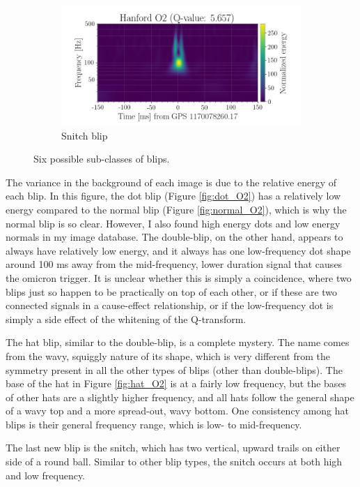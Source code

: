 \documentclass[a4paper]{article}
\begin{document}
\begin{figure}[h!]
\begin{subfigure}{.49\textwidth}
		\centering
		\includegraphics[width=1\linewidth]{snitch_O2}
		\caption{Snitch blip}
		\label{fig:snitch_O2}
	\end{subfigure}
	\caption{Six possible sub-classes of blips.}
	\label{fig:six}
\end{figure}

The variance in the background of each image is due to the relative energy of each blip. In this figure, the dot blip (Figure \ref{fig:dot_O2}) has a relatively low energy compared to the normal blip (Figure \ref{fig:normal_O2}), which is why the normal blip is so clear. However, I also found high energy dots and low energy normals in my image database. The double-blip, on the other hand, appears to always have relatively low energy, and it always has one low-frequency dot shape around 100 ms away from the mid-frequency, lower duration signal that causes the omicron trigger. It is unclear whether this is simply a coincidence, where two blips just so happen to be practically on top of each other, or if these are two connected signals in a cause-effect relationship, or if the low-frequency dot is simply a side effect of the whitening of the Q-transform.

The hat blip, similar to the double-blip, is a complete mystery. The name comes from the wavy, squiggly nature of its shape, which is very different from the symmetry present in all the other types of blips (other than double-blips). The base of the hat in Figure \ref{fig:hat_O2} is at a fairly low frequency, but the bases of other hats are a slightly higher frequency, and all hats follow the general shape of a wavy top and a more spread-out, wavy bottom. One consistency among hat blips is their general frequency range, which is low- to mid-frequency.

The last new blip is the snitch, which has two vertical, upward trails on either side of a round ball. Similar to other blip types, the snitch occurs at both high and low frequency. 
\end{document}
